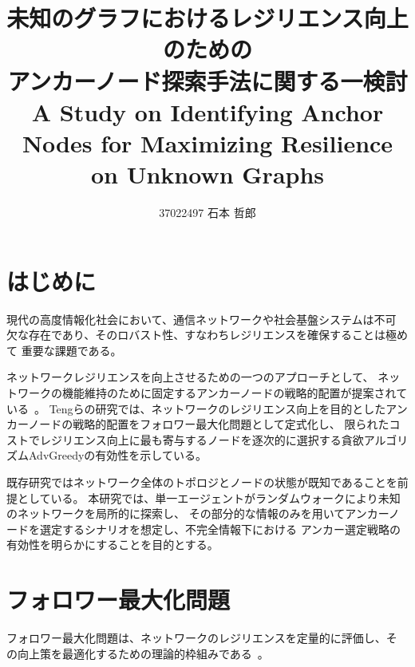 \documentclass[twocolumn,a4paper, dvipdfmx]{ieicejsp}
\title{{\bf 未知のグラフにおけるレジリエンス向上のための \\アンカーノード探索手法に関する一検討}\\
  {\normalsize A Study on Identifying Anchor Nodes for Maximizing Resilience on Unknown Graphs}
}
\author{
  37022497 石本 哲郎
}
\begin{document}
\maketitle


\section{はじめに}

現代の高度情報化社会において、通信ネットワークや社会基盤システムは不可
欠な存在であり、そのロバスト性、すなわちレジリエンスを確保することは極めて
重要な課題である。

ネットワークレジリエンスを向上させるための一つのアプローチとして、
ネットワークの機能維持のために固定するアンカーノードの戦略的配置が提案されている~\cite{Teng24:WWW}。
Tengらの研究では、ネットワークのレジリエンス向上を目的としたアンカーノードの戦略的配置をフォロワー最大化問題として定式化し、
限られたコストでレジリエンス向上に最も寄与するノードを逐次的に選択する貪欲アルゴリズムAdvGreedyの有効性を示している。


既存研究ではネットワーク全体のトポロジとノードの状態が既知であることを前提としている。
本研究では、単一エージェントがランダムウォークにより未知のネットワークを局所的に探索し、
その部分的な情報のみを用いてアンカーノードを選定するシナリオを想定し、不完全情報下における
アンカー選定戦略の有効性を明らかにすることを目的とする。


\section{フォロワー最大化問題}

フォロワー最大化問題は、ネットワークのレジリエンスを定量的に評価し、そ
の向上策を最適化するための理論的枠組みである~\cite{Teng24:WWW}。
\end{document}
